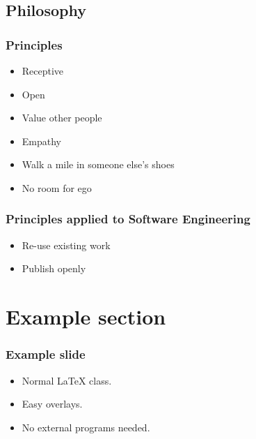 \subsection{Philosophy}
\frame
{
  \frametitle{Principles}
  \begin{itemize}
    \item Receptive
    \item Open
    \item Value other people
    \item Empathy
    \item Walk a mile in someone else's shoes
    \item No room for ego
  \end{itemize}
}
\frame
{
  \frametitle{Principles applied to Software Engineering}
  \begin{itemize}
    \item Re-use existing work
    \item Publish openly
  \end{itemize}
}
\section{Example section}
\frame
{
  \frametitle{Example slide}

  \begin{itemize}
    \item<1-> Normal LaTeX class.
    \item<2-> Easy overlays.
    \item<3-> No external programs needed.      
  \end{itemize}
}

